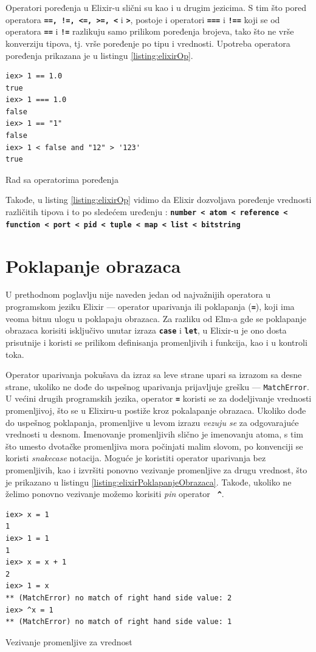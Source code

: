 \documentclass[12pt,oneside]{memoir}
\begin{document}
Operatori poređenja u Elixir-u slični su kao i u drugim jezicima. S tim što pored operatora 
\texttt{\textbf{==, !=, <=, >=, <}} i \texttt{\textbf{>}}, postoje i operatori 
\texttt{\textbf{===}} i \texttt{\textbf{!==}} koji se od operatora \texttt{\textbf{==}} i
\texttt{\textbf{!=}} razlikuju samo prilikom poređenja brojeva, tako što ne vrše konverziju
tipova, tj. vrše poređenje po tipu i vrednosti. Upotreba operatora poređenja prikazana je u
listingu \ref{listing:elixirOp}.  
\begin{listing}[!h]
\begin{verbatim}
iex> 1 == 1.0
true
iex> 1 === 1.0
false
iex> 1 == "1"
false
iex> 1 < false and "12" > '123'
true
\end{verbatim}
\caption{Rad sa operatorima poređenja}
\label{listing:elixirOp}
\end{listing}

Takođe, u listing \ref{listing:elixirOp} vidimo da Elixir dozvoljava poređenje vrednosti
različitih tipova i to po sledećem uređenju : \textbf{\texttt{number < atom < reference <
function < port < pid < tuple < map < list < bitstring}}

\section{Poklapanje obrazaca}
U prethodnom poglavlju nije naveden jedan od najvažnijih operatora u programskom jeziku
Elixir ---  operator uparivanja ili poklapanja (\texttt{\textbf{=}}), koji ima veoma
bitnu ulogu u poklapaju obrazaca. Za razliku od Elm-a gde se
poklapanje obrazaca korisiti isključivo unutar izraza \textbf{\texttt{case}} i
\textbf{\texttt{let}}, u Elixir-u je ono dosta prisutnije i koristi se prilikom
definisanja promenljivih i funkcija, kao i u kontroli toka.

Operator uparivanja pokušava da izraz sa leve strane upari sa izrazom sa desne strane,
ukoliko ne dođe do uspešnog uparivanja prijavljuje grešku --- \texttt{MatchError}.
U većini drugih programskih jezika, operator \texttt{\textbf{=}} koristi se za dodeljivanje
vrednosti promenljivoj, što se u Elixiru-u postiže kroz pokalapanje obrazaca. Ukoliko
dođe do uspešnog poklapanja, promenljive u levom izrazu \emph{vezuju se} za odgovarajuće
vrednosti u desnom. Imenovanje promenljivih slično je imenovanju atoma, s tim što umesto
dvotačke promenljiva mora počinjati malim slovom, po konvenciji se koristi
\emph{snake\textunderscore{}case} notacija. Moguće je koristiti operator uparivanja bez 
promenljivih, kao i izvršiti ponovno vezivanje promenljive za drugu vrednost, što je 
prikazano u listingu \ref{listing:elixirPoklapanjeObrazaca}. Takođe, ukoliko ne želimo
ponovno vezivanje možemo korisiti \emph{pin} operator \textbf{\texttt{ \^{}}}.  
\begin{listing}[!h]
\begin{verbatim}
iex> x = 1
1
iex> 1 = 1
1
iex> x = x + 1
2
iex> 1 = x  
** (MatchError) no match of right hand side value: 2
iex> ^x = 1
** (MatchError) no match of right hand side value: 1
\end{verbatim}
\caption{Vezivanje promenljive za vrednost}
\label{listing:elixirPoklapanjeObrazaca}
\end{listing}
\end{document}
